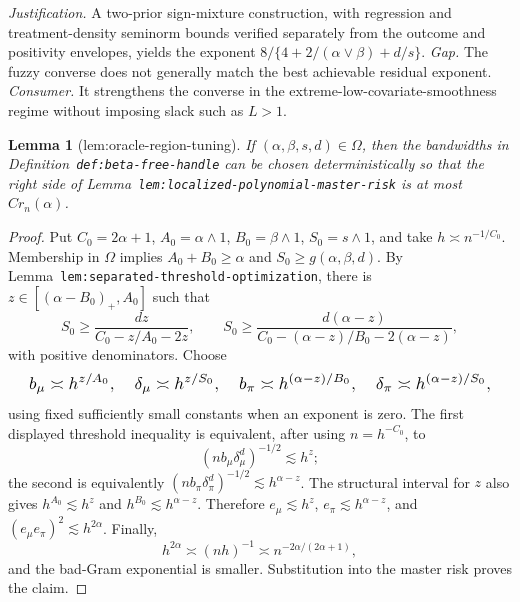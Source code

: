\documentclass{article}
\newtheorem{lemma}{Lemma}
\begin{document}
\par\smallskip\noindent \textit{Justification.} A two-prior sign-mixture construction, with regression and treatment-density seminorm bounds verified separately from the outcome and positivity envelopes, yields the exponent \(8/\{4+2/(\alpha\vee\beta)+d/s\}\). \textit{Gap.} The fuzzy converse does not generally match the best achievable residual exponent. \textit{Consumer.} It strengthens the converse in the extreme-low-covariate-smoothness regime without imposing slack such as \(L>1\).

\begin{lemma}[lem:oracle-region-tuning]\label{lem:oracle-region-tuning}
If \((\alpha,\beta,s,d)\in\Omega\), then the bandwidths in Definition~\texttt{def:beta-free-handle} can be chosen deterministically so that the right side of Lemma~\texttt{lem:localized-polynomial-master-risk} is at most \(C r_n(\alpha)\).
\end{lemma}
\begin{proof}
Put \(C_0=2\alpha+1\), \(A_0=\alpha\wedge1\), \(B_0=\beta\wedge1\), \(S_0=s\wedge1\), and take \(h\asymp n^{-1/C_0}\). Membership in \(\Omega\) implies \(A_0+B_0\ge\alpha\) and \(S_0\ge g(\alpha,\beta,d)\). By Lemma~\texttt{lem:separated-threshold-optimization}, there is \(z\in[(\alpha-B_0)_+,A_0]\) such that
\[
S_0\ge\frac{dz}{C_0-z/A_0-2z},\qquad S_0\ge\frac{d(\alpha-z)}{C_0-(\alpha-z)/B_0-2(\alpha-z)},
\]
with positive denominators. Choose
\[
\makebox[\linewidth][c]{\resizebox{0.98\linewidth}{!}{\par\noindent \makebox[\linewidth][c]{\resizebox{0.98\linewidth}{!}{\(\displaystyle \displaystyle b_\mu\asymp h^{z/A_0},\quad \delta_\mu\asymp h^{z/S_0},\quad b_\pi\asymp h^{(\alpha-z)/B_0},\quad \delta_\pi\asymp h^{(\alpha-z)/S_0},\)}}\par\noindent}}
\]
using fixed sufficiently small constants when an exponent is zero. The first displayed threshold inequality is equivalent, after using \(n=h^{-C_0}\), to
\[
(nb_\mu\delta_\mu^d)^{-1/2}\lesssim h^z;
\]
the second is equivalently \((nb_\pi\delta_\pi^d)^{-1/2}\lesssim h^{\alpha-z}\). The structural interval for \(z\) also gives \(h^{A_0}\lesssim h^z\) and \(h^{B_0}\lesssim h^{\alpha-z}\). Therefore \(e_\mu\lesssim h^z\), \(e_\pi\lesssim h^{\alpha-z}\), and \((e_\mu e_\pi)^2\lesssim h^{2\alpha}\). Finally,
\[
h^{2\alpha}\asymp (nh)^{-1}\asymp n^{-2\alpha/(2\alpha+1)},
\]
and the bad-Gram exponential is smaller. Substitution into the master risk proves the claim.
\end{proof}
\end{document}
